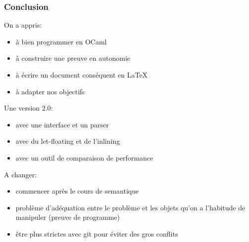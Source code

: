 \documentclass{beamer}
\begin{document}
\begin{frame}
\frametitle{Conclusion}
On a appris:
\begin{itemize}
    \item à bien programmer en OCaml
    \item à construire une preuve en autonomie
    \item à écrire un document conséquent en LaTeX
    \item à adapter nos objectifs
\end{itemize}
Une version 2.0:
\begin{itemize}
    \item avec une interface et un parser
    \item avec du let-floating et de l’inlining
    \item avec un outil de comparaison de performance
\end{itemize}
A changer:
\begin{itemize}
    \item commencer après le cours de semantique
    \item problème d’adéquation entre le problème et les objets qu’on a l’habitude de manipuler (preuve de programme)
    \item être plus strictes avec git pour éviter des gros conflits
\end{itemize}
\end{frame}
\end{document}
